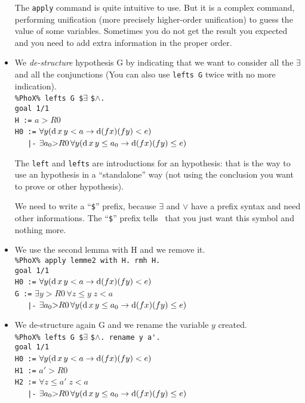 \begin{itemize}
The \verb~apply~ command is quite intuitive to use. But it is a complex
command, performing unification (more precisely higher-order
unification) to guess the value of some variables. 
Sometimes you do not get the result you expected and you need
to add extra information in the proper order.

\item We {\em de-structure} hypothesis G by indicating that we want to consider all the
 $\exists$ and all the  conjunctions (You can also use  \verb~lefts G~ twice with no more indication).\\
\verb~%PhoX% lefts G $~$\exists$ \verb~$~$\land$\verb~.~\\
\verb~goal 1/1~\\
\verb~H :=~  $a > R0$\\
\verb~H0 :=~ $\forall y (\hbox{d}\,x\,y < a \to \hbox{d} (f x) (f y) < e)$\\
\verb~   |-~ $\exists a_0{>}R0 \,\forall y (\hbox{d}\,x\,y \leq a_0 \to \hbox{d} (f x) (f y) \leq e)$

The \verb~left~ and \verb~lefts~ are introductions for an hypothesis:
that is the way to use an hypothesis in a ``standalone'' way (not
using the conclusion you want to prove or other hypothesis).

We need to write a ``\verb~$~'' prefix, because $\exists$ and $\lor$ have
a prefix syntax and need other informations. The ``\verb~$~'' prefix tells
\AFD\ that you just want this
symbol and nothing more.

\item We use the second lemma with  H and we remove it.\\
\verb~%PhoX% apply lemme2 with H. rmh H.~\\
\verb~goal 1/1~\\
\verb~H0 :=~ $\forall y (\hbox{d}\,x\,y < a \to \hbox{d} (f x) (f y) < e)$\\
\verb~G :=~ $\exists y{>}R0 \, \forall z{\leq}y \;  z < a$\\
\verb~   |-~ $\exists a_0{>}R0 \,\forall y (\hbox{d}\,x\,y \leq a_0 \to \hbox{d} (f x) (f y) \leq e)$

\item We de-structure again G and we rename the variable $y$ created.\\
\verb~%PhoX% lefts G $~$\exists$ \verb~$~$\land$\verb~. rename y a'.~\\
\verb~goal 1/1~\\
\verb~H0 :=~ $\forall y (\hbox{d}\,x\,y < a \to \hbox{d} (f x) (f y) < e)$\\
\verb~H1 :=~ $a' > R0$\\
\verb~H2 :=~ $\forall z{\leq}a' \; z < a$\\
\verb~   |-~ $\exists a_0{>}R0 \, \forall y (\hbox{d}\,x\,y \leq a_0 \to \hbox{d} (f x) (f y) \leq e)$


\end{itemize}
